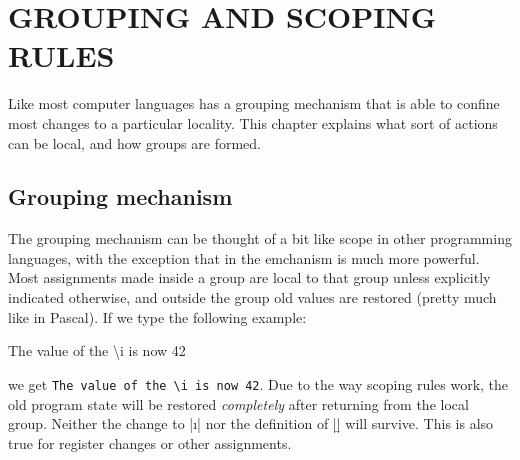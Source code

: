 \chapter{GROUPING AND SCOPING RULES}
\label{ch:grouping}

Like most computer languages \tex has a grouping mechanism that is able to confine most changes to a particular locality. This chapter explains what sort of actions can be local, and how groups are formed.


\section{Grouping mechanism}

The grouping mechanism can be thought of a bit like scope in other programming languages, with the
exception that in \tex the emchanism is much more powerful. Most assignments made inside a group are local to that group
unless explicitly indicated otherwise, and outside the group old values are restored (pretty much like in Pascal). If we type the following  example:
\begin{teX}
\def\i{42}
{
   \def\i{43}
   \def\b{2}
}
The value of the \textbackslash i is now \i
\end{teX}
we get   \texttt{The value of the \textbackslash i is now 42}. Due to the way \tex scoping rules work, the old program state
will be restored \textit{completely} after returning from the local group. Neither the change to |\i| nor the definition of |\b| will survive. This is also true for register changes or other assignments.

